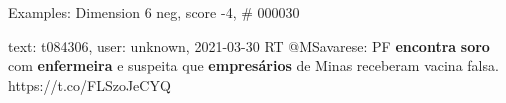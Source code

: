 \begin{frame}{Examples: Dimension 6 neg, score -4, \# 000030}
\footnotesize
\begin{alertblock}{text: t084306, user: unknown, 2021-03-30}
RT @MSavarese: PF \textbf{encontra} \textbf{soro} com \textbf{enfermeira} e 
suspeita que \textbf{empresários} de Minas receberam vacina falsa. 
https://t.co/FLSzoJeCYQ 
\end{alertblock}
\end{frame}
